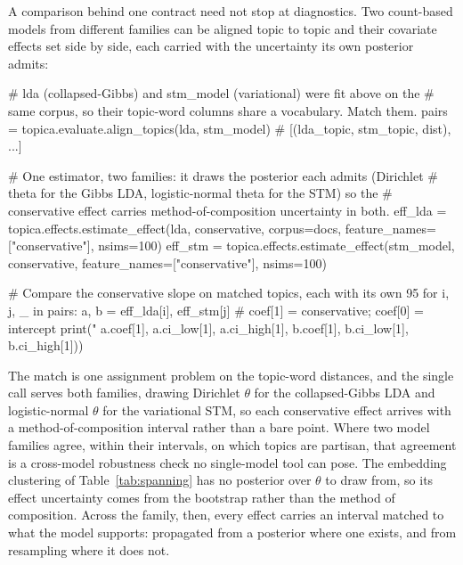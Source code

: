 \documentclass[article]{jss}
\begin{document}
A comparison behind one contract need not stop at diagnostics. Two count-based
models from different families can be aligned topic to topic and their covariate
effects set side by side, each carried with the uncertainty its own posterior
admits:

\begin{CodeChunk}
\begin{CodeInput}
# lda (collapsed-Gibbs) and stm_model (variational) were fit above on the
# same corpus, so their topic-word columns share a vocabulary. Match them.
pairs = topica.evaluate.align_topics(lda, stm_model)   # [(lda_topic, stm_topic, dist), ...]

# One estimator, two families: it draws the posterior each admits (Dirichlet
# theta for the Gibbs LDA, logistic-normal theta for the STM) so the
# conservative effect carries method-of-composition uncertainty in both.
eff_lda = topica.effects.estimate_effect(lda, conservative, corpus=docs,
                                         feature_names=["conservative"], nsims=100)
eff_stm = topica.effects.estimate_effect(stm_model, conservative,
                                         feature_names=["conservative"], nsims=100)

# Compare the conservative slope on matched topics, each with its own 95%
for i, j, _ in pairs:
    a, b = eff_lda[i], eff_stm[j]   # coef[1] = conservative; coef[0] = intercept
    print("%
        a.coef[1], a.ci_low[1], a.ci_high[1],
        b.coef[1], b.ci_low[1], b.ci_high[1]))
\end{CodeInput}
\end{CodeChunk}

The match is one assignment problem on the topic-word distances, and the single
 call serves both families, drawing Dirichlet $\theta$ for
the collapsed-Gibbs LDA and logistic-normal $\theta$ for the variational STM, so
each conservative effect arrives with a method-of-composition interval rather than
a bare point. Where two model families agree, within their intervals, on which
topics are partisan, that agreement is a cross-model robustness check no
single-model tool can pose. The embedding clustering of Table~\ref{tab:spanning}
has no posterior over $\theta$ to draw from, so its effect uncertainty comes from
the bootstrap rather than the method of composition. Across the family, then,
every effect carries an interval matched to what the model supports: propagated
from a posterior where one exists, and from resampling where it does not.
\end{document}
